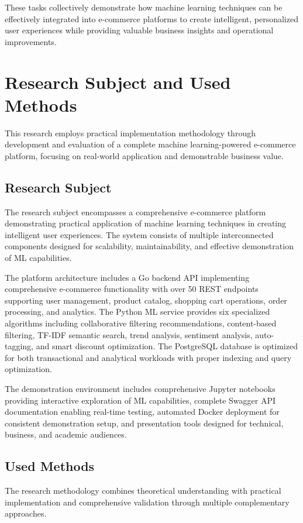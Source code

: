 \documentclass[12pt]{article}
\begin{document}
These tasks collectively demonstrate how machine learning techniques can be effectively integrated into e-commerce platforms to create intelligent, personalized user experiences while providing valuable business insights and operational improvements.

\section{Research Subject and Used Methods}
This research employs practical implementation methodology through development and evaluation of a complete machine learning-powered e-commerce platform, focusing on real-world application and demonstrable business value.

\subsection{Research Subject}
The research subject encompasses a comprehensive e-commerce platform demonstrating practical application of machine learning techniques in creating intelligent user experiences. The system consists of multiple interconnected components designed for scalability, maintainability, and effective demonstration of ML capabilities.

The platform architecture includes a Go backend API implementing comprehensive e-commerce functionality with over 50 REST endpoints supporting user management, product catalog, shopping cart operations, order processing, and analytics. The Python ML service provides six specialized algorithms including collaborative filtering recommendations, content-based filtering, TF-IDF semantic search, trend analysis, sentiment analysis, auto-tagging, and smart discount optimization. The PostgreSQL database is optimized for both transactional and analytical workloads with proper indexing and query optimization.

The demonstration environment includes comprehensive Jupyter notebooks providing interactive exploration of ML capabilities, complete Swagger API documentation enabling real-time testing, automated Docker deployment for consistent demonstration setup, and presentation tools designed for technical, business, and academic audiences.

\subsection{Used Methods}
The research methodology combines theoretical understanding with practical implementation and comprehensive validation through multiple complementary approaches.
\end{document}

